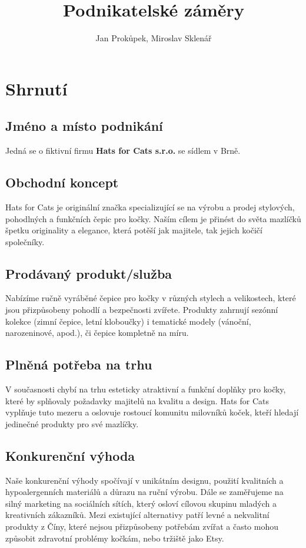 \documentclass[12pt, a4paper]{article}
\begin{document}
\nocite{csob-podnikatelsky-plan}
\author{Jan Prokůpek, Miroslav Sklenář}
\title{\textbf{Podnikatelské záměry}}
\date{}

\maketitle

\pagebreak

\tableofcontents

\pagebreak

\section{Shrnutí}

\subsection{Jméno a místo podnikání}
Jedná se o fiktivní firmu \textbf{Hats for Cats s.r.o.} se sídlem v Brně.

\subsection{Obchodní koncept}
Hats for Cats je originální značka specializující se na výrobu a prodej stylových, pohodlných a funkčních čepic pro kočky. 
Naším cílem je přinést do světa mazlíčků špetku originality a elegance, která potěší jak majitele, tak jejich kočičí společníky.

\subsection{Prodávaný produkt/služba}
Nabízíme ručně vyráběné čepice pro kočky v různých stylech a velikostech, 
které jsou přizpůsobeny pohodlí a bezpečnosti zvířete. 
Produkty zahrnují sezónní kolekce (zimní čepice, letní kloboučky) i tematické modely (vánoční, narozeninové, apod.),
či čepice kompletně na míru.

\subsection{Plněná potřeba na trhu}
V současnosti chybí na trhu esteticky atraktivní a funkční doplňky pro kočky, které by splňovaly požadavky majitelů na kvalitu a design. Hats for Cats vyplňuje tuto mezeru a oslovuje rostoucí komunitu milovníků koček, kteří hledají jedinečné produkty pro své mazlíčky.

\subsection{Konkurenční výhoda}
Naše konkurenční výhody spočívají v unikátním designu, použití kvalitních a hypoalergenních materiálů a důrazu na ruční výrobu. Dále se zaměřujeme na silný marketing na sociálních sítích, který osloví cílovou skupinu mladých a kreativních zákazníků.
Mezi existující alternativy patří levné a nekvalitní produkty z Číny, které nejsou přizpůsobeny potřebám zvířat a často mohou
způsobit zdravotní problémy kočkám, nebo tržiště jako Etsy.
\end{document}

